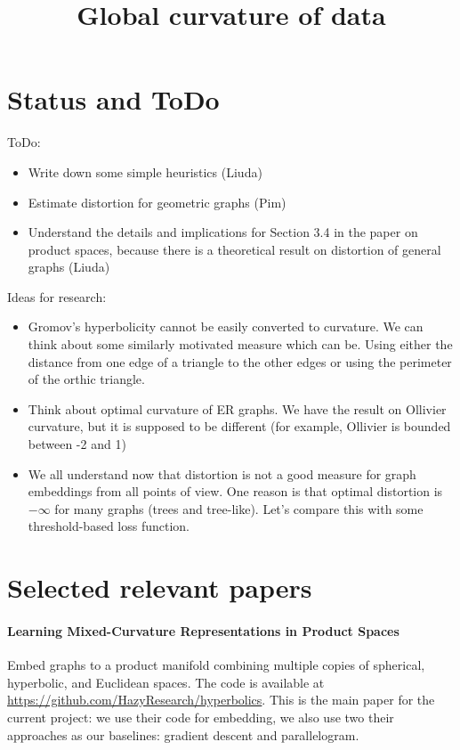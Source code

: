 \documentclass{article}
\title{Global curvature of data}
\author{}
\date{}
\begin{document}
\maketitle

\section{Status and ToDo}

ToDo:
\begin{itemize}
    \item Write down some simple heuristics (Liuda)
    \item Estimate distortion for geometric graphs (Pim)
    \item Understand the details and implications for Section 3.4 in the paper on product spaces, because there is a theoretical result on distortion of general graphs (Liuda)
\end{itemize}

Ideas for research:
\begin{itemize}
    \item Gromov's hyperbolicity cannot be easily converted to curvature. We can think about some similarly motivated measure which can be. Using either the distance from one edge of a triangle to the other edges or using the perimeter of the orthic triangle. 
    \item Think about optimal curvature of ER graphs. We have the result on  Ollivier curvature, but it is supposed to be different (for example, Ollivier is bounded between -2 and 1)
    \item We all understand now that distortion is not a good measure for graph embeddings from all points of view. One reason is that optimal distortion is $-\infty$ for many graphs (trees and tree-like). Let's compare this with some threshold-based loss function.
\end{itemize}

\section{Selected relevant papers}

\paragraph{Learning Mixed-Curvature Representations in Product Spaces~\cite{gu2019learning}}

Embed graphs to a product manifold combining multiple copies of spherical,
hyperbolic, and Euclidean spaces. The code is available at \url{https://github.com/HazyResearch/hyperbolics}. 
This is the main paper for the current project: we use their code for embedding, we also use two their approaches as our baselines: gradient descent and parallelogram. 
\end{document}
